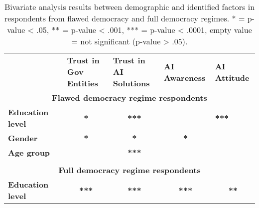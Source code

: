 \documentclass[
]{ceurart}
\begin{document}


 \begin{table}
    \begin{center}
    {\caption{Bivariate analysis results between demographic and identified factors in respondents from flawed democracy and full democracy regimes. * = p-value < .05, ** = p-value < .001, *** = p-value <  .0001, empty value = not significant (p-value >  .05).}\label{splitdata}}
    \begin{tabular}{llllll}
    \cline{1-6}
    \multicolumn{1}{c}{} & \multicolumn{1}{c}{\textbf{}} & \multicolumn{1}{p{2.5cm}}{\textbf{Trust in Gov Entities}}         & \multicolumn{1}{p{2.5cm}}{\textbf{Trust in AI Solutions}} & \multicolumn{1}{p{2.5cm}}{\textbf{AI Awareness}} & \multicolumn{1}{p{2.5cm}}{\textbf{AI Attitude}}                  \\ 
    \cline{1-6}
    \multicolumn{6}{c}{\textbf{Flawed democracy regime respondents}}                                                                    \\
         \cline{1-6}
     \textbf{Education level}                     &                                & \multicolumn{1}{c}{\textbf{*}} & \multicolumn{1}{c}{\textbf{***}} &    &  \textbf{***}  \\
    \cline{1-6}

    
    \textbf{Gender}                              &                                & \multicolumn{1}{c}{\textbf{*}}             & \multicolumn{1}{c}{\textbf{*}} & \multicolumn{1}{c}{\textbf{*}}   &          \\
    \cline{1-6}
 
    
    \textbf{Age group}                           &                                & \multicolumn{1}{c}{}           & \multicolumn{1}{c}{\textbf{***}} &    &   \\
    \cline{1-6}\\

        \multicolumn{6}{c}{\textbf{Full democracy regime respondents}}                                                                                 \\
        \cline{1-6}
     \textbf{Education level}                     &                                & \multicolumn{1}{c}{\textbf{***}} & \multicolumn{1}{c}{\textbf{***}} & \multicolumn{1}{c}{\textbf{***}} & \multicolumn{1}{c}{\textbf{**}} \\
    \cline{1-6}
 

\end{tabular}
\end{center}
\end{table}
\end{document}
